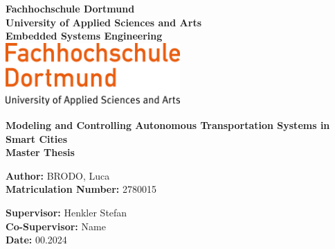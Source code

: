 

\begin{titlepage}
    \centering
    \vspace*{0.5cm}
    \Large
    \textbf{Fachhochschule Dortmund} \\
    \textbf{University of Applied Sciences and Arts} \\
    \textbf{Embedded Systems Engineering}\\
	\centering
	\vspace{1cm}
	\includegraphics[width=0.5\textwidth]{assets/img/01_title/FH_Dortmund-logo.svg.png}

    \vspace{2cm}

    \LARGE
    \textbf{Modeling and Controlling Autonomous Transportation Systems in Smart Cities} \\
     \vspace{1cm}
    \textbf{Master Thesis}

    \vspace{1cm}

    \large
    \textbf{Author:} \hspace{0.5cm} BRODO, Luca\\
    \textbf{Matriculation Number:} \hspace{0.5cm} 2780015

    \vspace{1cm}


    
   

    \textbf{Supervisor:} \hspace{0.5cm} Henkler Stefan \\
    \textbf{Co-Supervisor:} \hspace{0.5cm} Name \\
    \textbf{Date:} \hspace{0.5cm} 00.2024

    \vfill
    \vspace{1cm}

\end{titlepage}

